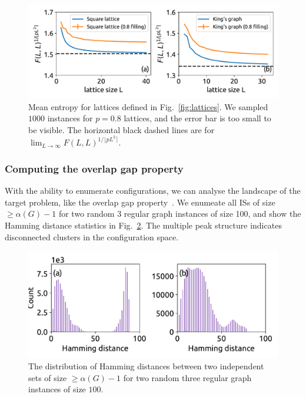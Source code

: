 \documentclass[onefignum, onetabnum]{siamart190516}
\newcommand{\<}{\langle}
\renewcommand{\>}{\rangle}
\newcommand{\Fig}[1]{Fig.~\ref{#1}}
\begin{document}
\begin{figure}[t] 
    \centering
    \includegraphics[width=\textwidth, trim={0cm 0cm 0cm 0cm}, clip]{figures/fig5.pdf}
    \caption{Mean entropy for lattices defined in \Fig{fig:lattices}.
    We sampled $1000$ instances for $p=0.8$ lattices, and the error bar is too small to be visible.
    The horizontal black dashed lines are for $\lim_{L\rightarrow \infty} F(L,L)^{1/\lfloor pL^2 \rceil}$.
    }
    \label{fig:hardsquare}
\end{figure}

\subsubsection{Computing the overlap gap property}

With the ability to enumerate configurations, we can analyse the landscape of the target problem, like the overlap gap property~\cite{Gamarnik2013, Gamarnik2019}.
We enumeate all ISs of size $\geq\alpha(G)-1$ for two random 3 regular graph instances of size 100, and show the Hamming distance statistics in \Fig{fig:hamming}.
The multiple peak structure indicates disconnected clusters in the configuration space.
\begin{figure} 
    \centering
    \includegraphics[width=\textwidth, trim={0cm 0cm 0cm 0cm}, clip]{figures/fig3.pdf}
    \caption{The distribution of Hamming distances between two independent sets of size $\geq\alpha(G)-1$ for two random three regular graph instances of size $100$.}
    \label{fig:hamming}
\end{figure}
\end{document}
